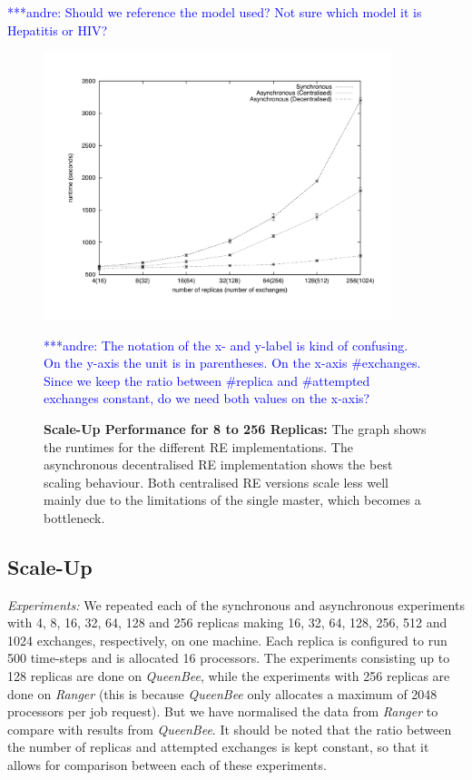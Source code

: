 \documentclass{rspublic}
\newcommand{\alnote}[1]{ {\textcolor{blue} { ***andre: #1 }}}
\newcommand{\alnote}[1]{}
\begin{document}
{\alnote{Should we reference the model used? Not sure which model it is
Hepatitis or HIV?}

%
\begin{figure}
\centering
\includegraphics[width=0.9\textwidth]{../data/scale_up_gnu.pdf}
\caption{\small \textbf{Scale-Up Performance for 8 to 256 Replicas:}
  The graph shows the runtimes for the different RE implementations.
  The asynchronous decentralised RE implementation shows the best
  scaling behaviour. Both centralised RE versions scale less well
  mainly due to the limitations of the single master, which becomes a
  bottleneck.}
\label{fig:scaleup}
\alnote{The notation of the x- and y-label is kind of confusing. On
  the y-axis the unit is in parentheses. On the x-axis
  \#exchanges. Since we keep the ratio between \#replica and
  \#attempted exchanges constant, do we need both values on the
  x-axis?}  \vspace{-1em}
\end{figure}

\subsection{Scale-Up}


{\it Experiments: }
We repeated each of the synchronous and asynchronous experiments with 4, 8, 16, 32, 64, 128 and 256 replicas making 16, 32, 64, 128, 256, 512 and 1024 exchanges, respectively, on one machine. Each replica is configured to run 500 time-steps and is allocated 16 processors. The experiments consisting up to 128 replicas are done on {\it QueenBee}, while the experiments with 256 replicas are done on \emph{Ranger} (this is because \emph{QueenBee} only allocates a maximum of 2048 processors per job request). But we have normalised the data from {\it Ranger} to compare with results from \emph{QueenBee}.
It should be noted that the ratio between the number of
replicas and attempted exchanges is kept constant, so that it allows for comparison between each of these experiments.

}
\end{document}
